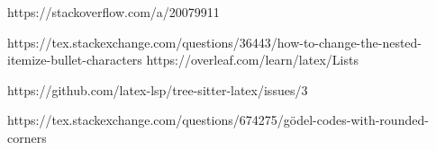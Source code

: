 https://stackoverflow.com/a/20079911

https://tex.stackexchange.com/questions/36443/how-to-change-the-nested-itemize-bullet-characters
https://overleaf.com/learn/latex/Lists

https://github.com/latex-lsp/tree-sitter-latex/issues/3

https://tex.stackexchange.com/questions/674275/gödel-codes-with-rounded-corners
